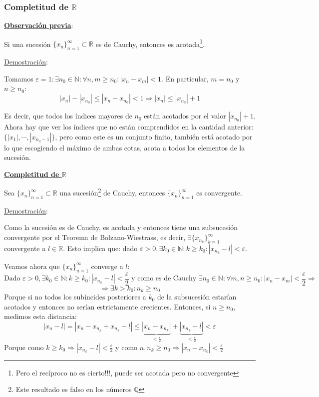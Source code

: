 \documentclass[10pt,a4paper,openright]{book}
\begin{document}
\subsubsection*{Completitud de $\mathbb R$}
\textbf{\underline{Observación previa}}:\par
Si una sucesión $\{x_n\}_{n=1}^\infty\subset \mathbb R$ es de Cauchy, entonces es acotada\footnote{Pero el recíproco no es cierto!!!, puede ser acotada pero no convergente}.\par
\underline{Demostración}:\par
Tomamos $\varepsilon=1: \exists n_0\in \mathbb N: \forall n,m\geq n_0: |x_n-x_m|<1$. En particular, $m=n_0$ y $n\geq n_0$:
$$|x_n|-|x_{n_0}|\leq |x_n-x_{n_0}|<1\Rightarrow |x_n|\leq |x_{n_0}|+1$$

Es decir, que todos los índices mayores de $n_0$ están acotados por el valor $|x_{n_0}|+1$. Ahora hay que ver los índices que no están comprendidos en la cantidad anterior: $\{|x_1|, \cdots, |x_{n_0-1}|\}$, pero como este es un conjunto finito, también está acotado por lo que escogiendo el máximo de ambas cotas, acota a todos los elementos de la sucesión.

\vspace{0.25cm}

\textbf{\underline{Completitud de $\mathbb R$}}\par
Sea $\{x_n\}_{n=1}^\infty\subset \mathbb R$ una sucesión\footnote{Este resultado es falso en los números $\mathbb Q$} de Cauchy, entonces $\{x_n\}_{n=1}^\infty$ es convergente.\par

\underline{Demostración}:\par
Como la sucesión es de Cauchy, es acotada y entonces tiene una subsucesión convergente por el Teorema de Bolzano-Wiestrass, es decir, $\exists \{x_{n_k}\}_{k=1}^\infty$ convergente a $l\in \mathbb R$. Esto implica que: dado $\varepsilon>0, \exists k_0\in \mathbb N: k\geq k_0: |x_{n_k}-l|<\varepsilon$.\par

Veamos ahora que $\{x_n\}_{n=1}^\infty$ converge a $l$:
$$\mbox{Dado }\varepsilon>0, \exists k_0\in \mathbb N: k\geq k_0: |x_{n_k}-l|<\frac{\varepsilon}{2}\mbox{ y como es de Cauchy }\exists n_0\in\mathbb N: \forall m,n\geq n_0: |x_n-x_m|<\frac{\varepsilon}{2}\Rightarrow$$
$$\Rightarrow \exists k>k_0: n_k\geq n_0$$
Porque si no todos los subíncides posteriores a $k_0$ de la subsucesión estarían acotados y entonces no serían estrictamente crecientes.
Entonces, si $n\geq n_0$, medimos esta distancia:
$$|x_n-l|=|x_n-x_{n_k}+x_{n_k}-l|\leq \underbrace{|x_n-x_{n_k}|}_{< \frac{\varepsilon}{2}}+\underbrace{|x_{n_k}-l|}_{< \frac{\varepsilon}{2}}<\varepsilon$$
Porque como $k\geq k_0\Rightarrow |x_{n_k}-l|<\frac{\varepsilon}{2}$ y como $n,n_k\geq n_0\Rightarrow |x_n-x_{n_k}|<\frac{\varepsilon}{2}$
\end{document}
